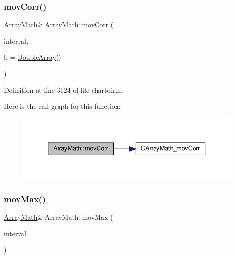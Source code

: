 \mbox{\label{class_array_math_a61cdecb4beb7c276a122306906cdebd8}} 
\subsubsection{\texorpdfstring{mov\+Corr()}{movCorr()}}
{\footnotesize\ttfamily \hyperlink{class_array_math}{Array\+Math}\& Array\+Math\+::mov\+Corr (\begin{DoxyParamCaption}\item[{int}]{interval,  }\item[{\hyperlink{class_double_array}{Double\+Array}}]{b = {\ttfamily \hyperlink{class_double_array}{Double\+Array}()} }\end{DoxyParamCaption})\hspace{0.3cm}{\ttfamily [inline]}}



Definition at line 3124 of file chartdir.\+h.

Here is the call graph for this function\+:
\nopagebreak
\begin{figure}[H]
\begin{center}
\leavevmode
\includegraphics[width=333pt]{class_array_math_a61cdecb4beb7c276a122306906cdebd8_cgraph}
\end{center}
\end{figure}
\mbox{\label{class_array_math_a5134853d9b14c3d980036a02a4d4b043}} 
\subsubsection{\texorpdfstring{mov\+Max()}{movMax()}}
{\footnotesize\ttfamily \hyperlink{class_array_math}{Array\+Math}\& Array\+Math\+::mov\+Max (\begin{DoxyParamCaption}\item[{int}]{interval }\end{DoxyParamCaption})\hspace{0.3cm}{\ttfamily [inline]}}



